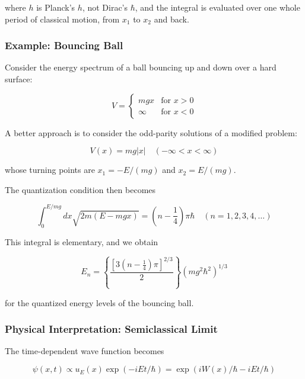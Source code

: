 \documentclass[11pt,a4paper]{article}
\begin{document}
where $h$ is Planck's $h$, not Dirac's $\hbar$, and the integral is evaluated over one whole period of classical motion, from $x_1$ to $x_2$ and back.

\subsubsection{Example: Bouncing Ball}

Consider the energy spectrum of a ball bouncing up and down over a hard surface:

\begin{equation}
V = \begin{cases} mgx & \text{for } x > 0 \\ \infty & \text{for } x < 0 \end{cases}
\tag{2.256}
\end{equation}

A better approach is to consider the odd-parity solutions of a modified problem:

\begin{equation}
V(x) = mg|x| \quad (-\infty < x < \infty)
\tag{2.258}
\end{equation}

whose turning points are $x_1 = -E/(mg)$ and $x_2 = E/(mg)$.

The quantization condition then becomes

\begin{equation}
\int_0^{E/mg} dx\sqrt{2m(E - mgx)} = \left(n - \frac{1}{4}\right)\pi\hbar \quad (n = 1, 2, 3, 4, \ldots)
\tag{2.261}
\end{equation}

This integral is elementary, and we obtain

\begin{equation}
\boxed{E_n = \left\{\frac{\left[3\left(n - \frac{1}{4}\right)\pi\right]^{2/3}}{2}\right\}(mg^2\hbar^2)^{1/3}}
\tag{2.262}
\end{equation}

for the quantized energy levels of the bouncing ball.

\subsubsection{Physical Interpretation: Semiclassical Limit}

The time-dependent wave function becomes

\begin{equation}
\psi(x, t) \propto u_E(x)\exp(-iEt/\hbar) = \exp(iW(x)/\hbar - iEt/\hbar)
\tag{2.263}
\end{equation}
\end{document}

